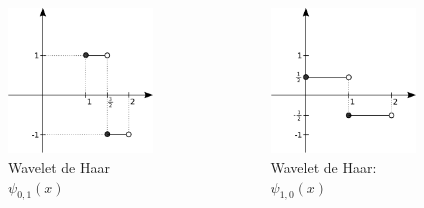 \begin{frame}[allowframebreaks]
\begin{columns}[c]

  \begin{figure}[htp]
  \centering
  \includegraphics[width=0.9\textwidth]{images/haar_01.pdf}
  \caption{Wavelet de Haar $\psi_{0,1}(x)$}
  \label{fig-haar_01}
  \end{figure}


  \begin{figure}[htp]
  \centering
  \includegraphics[width=0.9\textwidth]{images/haar_10.pdf}
  \caption{Wavelet de Haar: $\psi_{1,0}(x)$}
  \label{fig-haar_10}
  \end{figure}

  \end{columns}
\end{frame}


